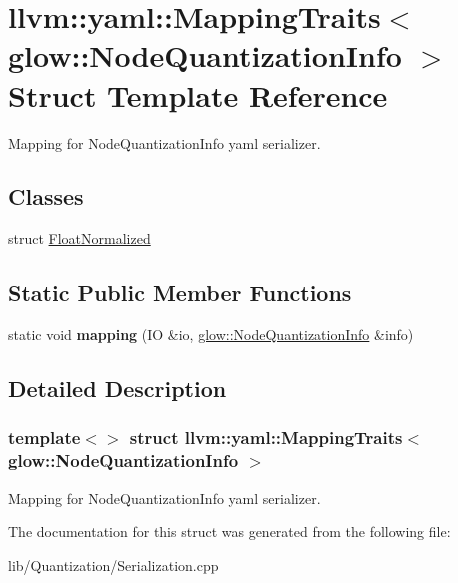 \hypertarget{structllvm_1_1yaml_1_1_mapping_traits_3_01glow_1_1_node_quantization_info_01_4}{}\section{llvm\+:\+:yaml\+:\+:Mapping\+Traits$<$ glow\+:\+:Node\+Quantization\+Info $>$ Struct Template Reference}
\label{structllvm_1_1yaml_1_1_mapping_traits_3_01glow_1_1_node_quantization_info_01_4}


Mapping for Node\+Quantization\+Info yaml serializer.  


\subsection*{Classes}
\begin{DoxyCompactItemize}
\item 
struct \hyperlink{structllvm_1_1yaml_1_1_mapping_traits_3_01glow_1_1_node_quantization_info_01_4_1_1_float_normalized}{Float\+Normalized}
\end{DoxyCompactItemize}
\subsection*{Static Public Member Functions}
\begin{DoxyCompactItemize}
\item 
\mbox{\label{structllvm_1_1yaml_1_1_mapping_traits_3_01glow_1_1_node_quantization_info_01_4_a00ab9c0c0f86b9fffd65da756fdeea7d}} 
static void {\bfseries mapping} (IO \&io, \hyperlink{structglow_1_1_node_quantization_info}{glow\+::\+Node\+Quantization\+Info} \&info)
\end{DoxyCompactItemize}


\subsection{Detailed Description}
\subsubsection*{template$<$$>$\newline
struct llvm\+::yaml\+::\+Mapping\+Traits$<$ glow\+::\+Node\+Quantization\+Info $>$}

Mapping for Node\+Quantization\+Info yaml serializer. 

The documentation for this struct was generated from the following file\+:\begin{DoxyCompactItemize}
\item 
lib/\+Quantization/Serialization.\+cpp\end{DoxyCompactItemize}
